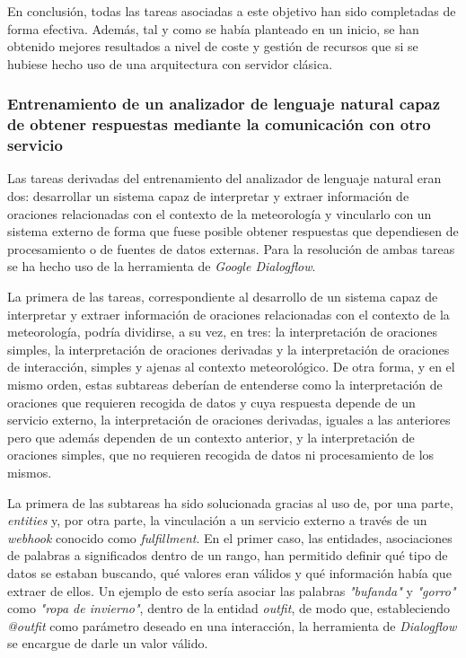 \documentclass[11pt,spanish,listoffigures]{tfgetsinf}
\begin{document}
En conclusión, todas las tareas asociadas a este objetivo han sido completadas de forma efectiva. Además, tal y como se había planteado en un inicio, se han obtenido mejores resultados a nivel de coste y gestión de recursos que si se hubiese hecho uso de una arquitectura con servidor clásica.

\subsubsection{Entrenamiento de un analizador de lenguaje natural capaz de obtener respuestas mediante la comunicación con otro servicio}

Las tareas derivadas del entrenamiento del analizador de lenguaje natural eran dos: desarrollar un sistema capaz de interpretar y extraer información de oraciones relacionadas con el contexto de la meteorología y vincularlo con un sistema externo de forma que fuese posible obtener respuestas que dependiesen de procesamiento o de fuentes de datos externas. Para la resolución de ambas tareas se ha hecho uso de la herramienta de \textit{Google Dialogflow}.

La primera de las tareas, correspondiente al desarrollo de un sistema capaz de interpretar y extraer información de oraciones relacionadas con el contexto de la meteorología, podría dividirse, a su vez, en tres: la interpretación de oraciones simples, la interpretación de oraciones derivadas y la interpretación de oraciones de interacción, simples y ajenas al contexto meteorológico. De otra forma, y en el mismo orden, estas subtareas deberían de entenderse como la interpretación de oraciones que requieren recogida de datos y cuya respuesta depende de un servicio externo, la interpretación de oraciones derivadas, iguales a las anteriores pero que además dependen de un contexto anterior, y la interpretación de oraciones simples, que no requieren recogida de datos ni procesamiento de los mismos.

La primera de las subtareas ha sido solucionada gracias al uso de, por una parte, \textit{entities} y, por otra parte, la vinculación a un servicio externo a través de un \textit{webhook} conocido como \textit{fulfillment}. En el primer caso, las entidades, asociaciones de palabras a significados dentro de un rango, han permitido definir qué tipo de datos se estaban buscando, qué valores eran válidos y qué información había que extraer de ellos. Un ejemplo de esto sería asociar las palabras \textit{"bufanda"} y \textit{"gorro"} como \textit{"ropa de invierno"}, dentro de la entidad \textit{outfit}, de modo que, estableciendo \textit{@outfit} como parámetro deseado en una interacción, la herramienta de \textit{Dialogflow} se encargue de darle un valor válido. 
\end{document}
